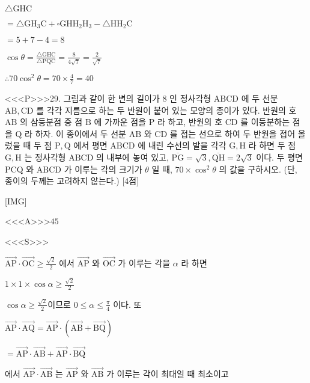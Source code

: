 \documentclass{oblivoir}
\begin{document}
$\triangle \mathrm{GHC}$

$=\triangle \mathrm{GH}_{3} \mathrm{C}+\square \mathrm{GHH}_{2} \mathrm{H}_{3}-\triangle \mathrm{HH}_{2} \mathrm{C}$

$=5+7-4=8$

$\cos \theta=\frac{\triangle \mathrm{GHC}}{\triangle \mathrm{P} \mathrm{QC}}=\frac{8}{4 \sqrt{7}}=\frac{2}{\sqrt{7}}$

$\therefore 70 \cos ^{2} \theta=70 \times \frac{4}{7}=40$


<<<P>>>29. 그림과 같이 한 변의 길이가 8 인 정사각형 $\mathrm{ABCD}$ 에 두 선분 $\mathrm{AB}, \mathrm{CD}$ 를 각각 지름으로 하는 두 반원이 붙어 있는 모양의 종이가 있다. 반원의 호 $\mathrm{AB}$ 의 삼등분점 중 점 $\mathrm{B}$ 에 가까운 점을 $\mathrm{P}$ 라 하고, 반원의 호 $\mathrm{CD}$ 를 이등분하는 점을 $\mathrm{Q}$ 라 하자. 이 종이에서 두 선분 $\mathrm{AB}$ 와 $\mathrm{CD}$ 를 접는 선으로 하여 두 반원을 접어 올렀을 때 두 점 $\mathrm{P}, \mathrm{Q}$ 에서 평면 $\mathrm{ABCD}$ 에 내린 수선의 발을 각각 $\mathrm{G}, \mathrm{H}$ 라 하면 두 점 $\mathrm{G}, \mathrm{H}$ 는 정사각형 $\mathrm{ABCD}$ 의 내부에 놓여 있고, $\overline{\mathrm{PG}}=\sqrt{3}, \overline{\mathrm{QH}}=2 \sqrt{3}$ 이다. 두 평면 $\mathrm{PCQ}$ 와 $\mathrm{ABCD}$ 가 이루는 각의 크기가 $\theta$ 일 때, $70 \times \cos ^{2} \theta$ 의 값을 구하시오. (단, 종이의 두께는 고려하지 않는다.) [4점]


[IMG]


<<<A>>>$45$

<<<S>>>



$\overrightarrow{\mathrm{AP}} \cdot \overrightarrow{\mathrm{OC}} \geq \frac{\sqrt{2}}{2}$ 에서 $\overrightarrow{\mathrm{AP}}$ 와 $\overrightarrow{\mathrm{OC}}$ 가 이루는
각을 $\alpha$ 라 하면

$1 \times 1 \times \cos \alpha \geq \frac{\sqrt{2}}{2} $

$\cos \alpha \geq \frac{\sqrt{2}}{2}$이므로 $0 \leq \alpha \leq \frac{\pi}{4}$ 이다. 또

$\overrightarrow{\mathrm{AP}} \cdot \overrightarrow{\mathrm{AQ}}=\overrightarrow{\mathrm{AP}} \cdot(\overrightarrow{\mathrm{AB}}+\overrightarrow{\mathrm{BQ}})$

$=\overrightarrow{\mathrm{AP}} \cdot \overrightarrow{\mathrm{AB}}+\overrightarrow{\mathrm{AP}} \cdot \overrightarrow{\mathrm{BQ}}$

에서 $\overrightarrow{\mathrm{AP}} \cdot \overrightarrow{\mathrm{AB}}$ 는 $\overrightarrow{\mathrm{AP}}$ 와 $\overrightarrow{\mathrm{AB}}$ 가 이루는 각이 최대일 때 최소이고
\end{document}
